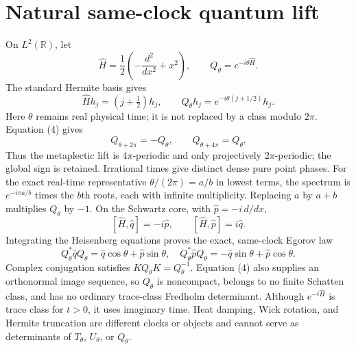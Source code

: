 \documentclass[10pt]{article}
\begin{document}
\section{Natural same-clock quantum lift}
On $L^2(\mathbb R)$, let
\[
\widehat H=\frac12\left(-\frac{d^2}{dx^2}+x^2\right),\qquad
Q_\theta=e^{-i\theta\widehat H}.
\]
The standard Hermite basis gives
\[
\widehat Hh_j=(j+\tfrac12)h_j,\qquad
Q_\theta h_j=e^{-i\theta(j+1/2)}h_j.\tag{4}
\]
Here $\theta$ remains real physical time; it is not replaced by a class
modulo $2\pi$.  Equation (4) gives
\[
Q_{\theta+2\pi}=-Q_\theta,\qquad Q_{\theta+4\pi}=Q_\theta.\tag{5}
\]
Thus the metaplectic lift is $4\pi$-periodic and only projectively
$2\pi$-periodic; the global sign is retained.  Irrational times give
distinct dense pure point phases.  For the exact real-time representative
$\theta/(2\pi)=a/b$ in lowest terms, the spectrum is
$e^{-i\pi a/b}$ times the $b$th roots, each with infinite multiplicity.
Replacing $a$ by $a+b$ multiplies $Q_\theta$ by $-1$.  On the Schwartz core,
with $\widehat p=-i\,d/dx$,
\[
[\widehat H,\widehat q]=-i\widehat p,
\qquad[\widehat H,\widehat p]=i\widehat q.
\]
Integrating the Heisenberg equations proves the exact, same-clock Egorov law
\[
Q_\theta^*\widehat qQ_\theta=\widehat q\cos\theta+\widehat p\sin\theta,
\quad
Q_\theta^*\widehat pQ_\theta=-\widehat q\sin\theta+\widehat p\cos\theta.
\tag{6}
\]
Complex conjugation satisfies $KQ_\theta K=Q_\theta^{-1}$.  Equation (4)
also supplies an orthonormal image sequence, so $Q_\theta$ is noncompact,
belongs to no finite Schatten class, and has no ordinary trace-class
Fredholm determinant.  Although $e^{-t\widehat H}$ is trace class for
$t>0$, it uses imaginary time.  Heat damping, Wick rotation, and Hermite
truncation are different clocks or objects and cannot serve as determinants
of $T_\theta$, $U_\theta$, or $Q_\theta$.
\end{document}
